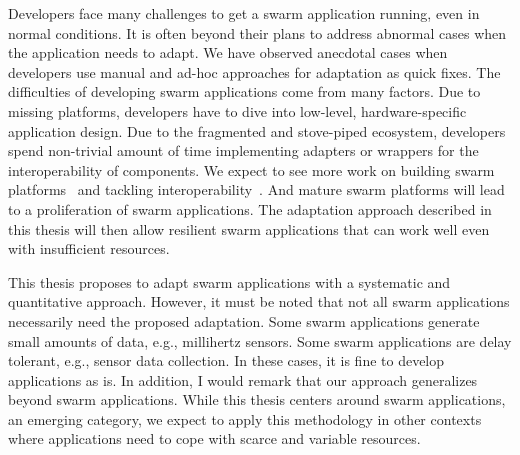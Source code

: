 \documentclass[thesis.tex]{subfiles}
\begin{document}
Developers face many challenges to get a swarm application running, even in
normal conditions. It is often beyond their plans to address abnormal cases when
the application needs to adapt. We have observed anecdotal cases when developers
use manual and ad-hoc approaches for adaptation as quick fixes. The difficulties
of developing swarm applications come from many factors. Due to missing
platforms, developers have to dive into low-level, hardware-specific application
design. Due to the fragmented and stove-piped ecosystem, developers spend
non-trivial amount of time implementing adapters or wrappers for the
interoperability of components.  We expect to see more work on building swarm
platforms~\cite{mor2016toward, latronico2015vision} and tackling
interoperability~\cite{brooks2018component}. And mature swarm platforms will
lead to a proliferation of swarm applications. The adaptation approach described
in this thesis will then allow resilient swarm applications that can work well
even with insufficient resources.

This thesis proposes to adapt swarm applications with a systematic and
quantitative approach. However, it must be noted that not all swarm applications
necessarily need the proposed adaptation. Some swarm applications generate small
amounts of data, e.g., millihertz sensors. Some swarm applications are delay
tolerant, e.g., sensor data collection. In these cases, it is fine to develop
applications as is. In addition, I would remark that our approach generalizes
beyond swarm applications. While this thesis centers around swarm applications,
an emerging category, we expect to apply this methodology in other contexts
where applications need to cope with scarce and variable resources.
\end{document}
